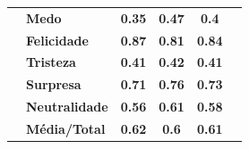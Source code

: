 \begin{table}[]
\begin{tabular}{llcccc}
                                       & \textbf{Medo}         & \textbf{0.35}                         & \textbf{0.47}                          & \textbf{0.4}                          &                                       \\
                                       & \textbf{Felicidade}   & \textbf{0.87}                         & \textbf{0.81}                          & \textbf{0.84}                         &                                       \\
                                       & \textbf{Tristeza}     & \textbf{0.41}                         & \textbf{0.42}                          & \textbf{0.41}                         &                                       \\
                                       & \textbf{Surpresa}     & \textbf{0.71}                         & \textbf{0.76}                          & \textbf{0.73}                         &                                       \\
                                       & \textbf{Neutralidade} & \textbf{0.56}                         & \textbf{0.61}                          & \textbf{0.58}                         &                                       \\
                                       & \textbf{Média/Total}  & \textbf{0.62}                         & \textbf{0.6}                           & \textbf{0.61}                         &                                       \\ \hline
\end{tabular}
\end{table}



